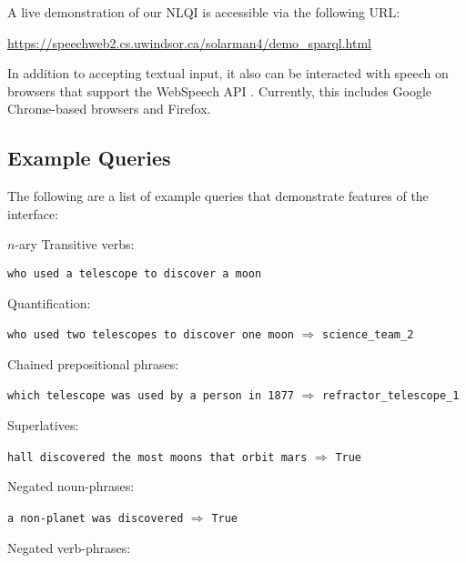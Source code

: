 \documentclass[../main.tex]{subfiles}
\begin{document}
\begin{refsection}
\noindent A live demonstration of our NLQI is accessible via the following URL:
\begin{center}
	\url{https://speechweb2.cs.uwindsor.ca/solarman4/demo_sparql.html}
\end{center}
In addition to accepting textual input, it also can be interacted with speech on browsers that support the WebSpeech API \cite{world2018web}.  Currently, this includes Google Chrome-based browsers and Firefox.

\subsection{Example Queries}

The following are a list of example queries that demonstrate features of the interface:

\noindent $n$-ary Transitive verbs:

\newcommand{\examplespacing}{\vspace{0.5em}}

\examplespacing

\texttt{who used a telescope to discover a moon}

\examplespacing

\noindent Quantification:

\examplespacing

\texttt{who used two telescopes to discover one moon} $\Rightarrow$ \texttt{science\_team\_2}

\examplespacing

\noindent Chained prepositional phrases:

\examplespacing

\texttt{which telescope was used by a person in 1877} $\Rightarrow$ \texttt{refractor\_telescope\_1}

\noindent Superlatives:

\examplespacing

\texttt{hall discovered the most moons that orbit mars} $\Rightarrow$ \texttt{True}

\examplespacing

\noindent Negated noun-phrases:

\examplespacing

\texttt{a non-planet was discovered} $\Rightarrow$ \texttt{True}

\examplespacing

\noindent Negated verb-phrases:

\examplespacing


\end{refsection}
\end{document}
